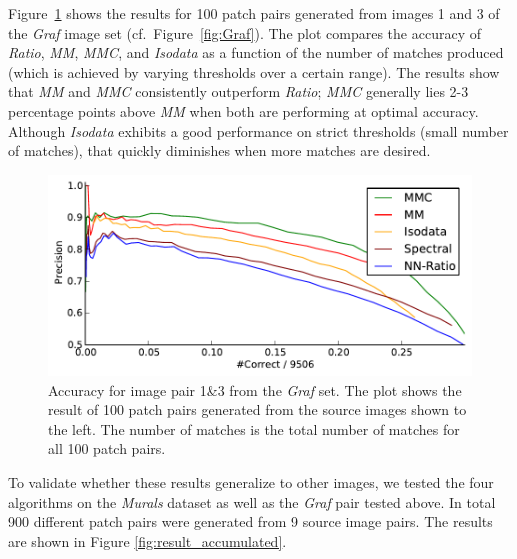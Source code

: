 \documentclass{article}
\begin{document}
Figure~\ref{fig:result_graf} shows the results for 100 patch pairs 
generated from images 1 and 3 of the \emph{Graf} image set 
(cf.~Figure~\ref{fig:Graf}). The plot compares the accuracy of 
\emph{Ratio}, \emph{MM}, \emph{MMC}, and \emph{Isodata} as a function of 
the number of matches produced (which is achieved by varying thresholds 
over a certain range). The results show that \emph{MM} and \emph{MMC} 
consistently outperform \emph{Ratio}; \emph{MMC} generally lies 2-3 
percentage points above \emph{MM} when both are performing at optimal 
accuracy.  Although \emph{Isodata} exhibits a good performance on strict 
thresholds (small number of matches), that quickly diminishes when more 
matches are desired.


\begin{figure}[htb]
			\centering
			\includegraphics[width=0.6\columnwidth]{images/result_graf}
	\caption{Accuracy for image pair 1\&3 from the \emph{Graf} set. The plot 
		shows the result of 100 patch pairs generated from the source 
		images shown to the left. The number of matches is the total 
		number of matches for all 100 patch pairs.}
	\label{fig:result_graf}
\end{figure}

To validate whether these results 
generalize to other images, we tested the four algorithms on the 
\emph{Murals} dataset as well as the \emph{Graf} pair tested above.  
In total 900 different patch pairs were generated from 9 
source image pairs.  The results are shown in Figure 
\ref{fig:result_accumulated}. 
\end{document}

